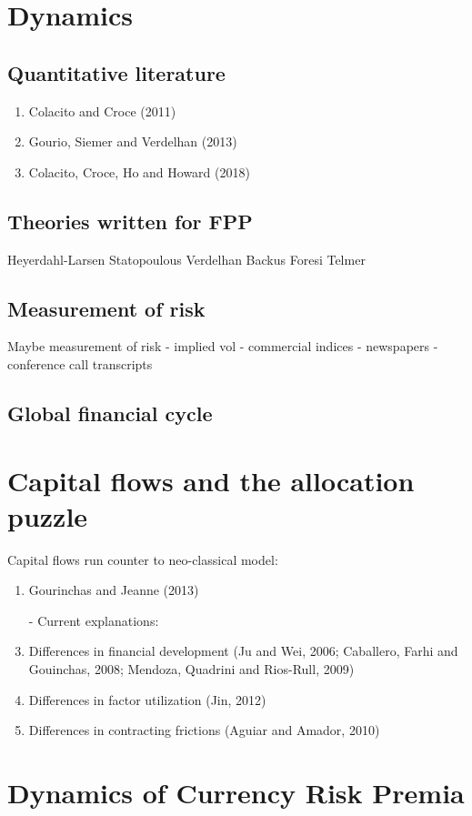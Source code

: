 \documentclass[12pt,letter]{article}
\theoremstyle{break} \theorembodyfont{\normalfont\itshape}
\theoremstyle{break}
\theoremstyle{break} \theorembodyfont{\normalfont\itshape}
\theoremstyle{break} \theorembodyfont{\normalfont\itshape}
\begin{document}
\section{Dynamics}
\subsection{Quantitative literature}
\begin{enumerate}
\item Colacito and Croce (2011)
\item Gourio, Siemer and Verdelhan (2013)
\item Colacito, Croce, Ho and Howard (2018)
\end{enumerate}
\subsection{Theories written for FPP}
Heyerdahl-Larsen Statopoulous Verdelhan Backus Foresi Telmer
\subsection{Measurement of risk}
Maybe measurement of risk - implied vol - commercial indices -
newspapers - conference call transcripts
\subsection{Global financial cycle}

\section{Capital flows and the allocation puzzle}
Capital flows run counter to neo-classical model:
\begin{enumerate}
\item Gourinchas and Jeanne (2013)
\item[-] Current explanations:
\item Differences in financial development (Ju and Wei, 2006;
  Caballero, Farhi and Gouinchas, 2008; Mendoza, Quadrini and
  Rios-Rull, 2009)
\item Differences in factor utilization (Jin, 2012)
\item Differences in contracting frictions (Aguiar and Amador, 2010)
\end{enumerate}

\section{Dynamics of Currency Risk Premia}
\end{document}
